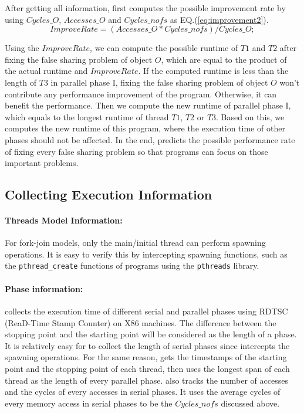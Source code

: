 After getting all information, \cheetah{} first computes the possible improvement rate by using $Cycles\_O$, $Accesses\_O$ and $Cycles\_{nofs}$ as EQ.(\ref{eq:improvement2}). 
\begin{equation}
\label{eq:improvement2}
 ImproveRate = (Accesses\_O * Cycles\_{nofs})/Cycles\_O;
\end{equation} 

Using the $ImproveRate$, we can compute the possible runtime of $T1$ and $T2$ after fixing the false sharing problem of object $O$, which are equal to the product of the actual runtime and $ImproveRate$. If the computed runtime is less than the length of $T3$ in parallel phase I, fixing the false sharing problem of object $O$ won't contribute any performance improvement of the program. Otherwise, it can benefit the performance. Then we compute the new runtime of parallel phase I, which equals to the longest runtime of thread $T1$, $T2$ or $T3$. Based on this, we computes the new runtime of this program, where the execution time of other phases should not be affected. In the end, \cheetah{} predicts the possible performance rate of fixing every false sharing problem so that programs can focus on those important problems. 

\subsection{Collecting Execution Information}
\label{sec:getactualtime}

\paragraph{Threads Model Information:} For fork-join models, only the main/initial thread can perform spawning operations. It is easy to verify this by intercepting spawning functions, such as the \texttt{pthread\_create} functions of programs using the \texttt{pthreads} library. 

\paragraph{Phase information:} \Cheetah{} collects the execution time of different serial and parallel phases using RDTSC (ReaD-Time Stamp Counter) on X86 machines.  The difference between the stopping point and the starting point will be considered as the length of a phase. It is relatively easy for \cheetah{} to collect the length of serial phases since \cheetah{} intercepts the spawning operations. For the same reason, \cheetah{} gets the timestamps of the starting point and the stopping point of each thread, then uses the longest span of each thread as the length of every parallel phase. \Cheetah{} also tracks the number of accesses and the cycles of every accesses in serial phases. It uses the average cycles of every memory access in serial phases to be the $Cycles\_{nofs}$ discussed above.  
 
